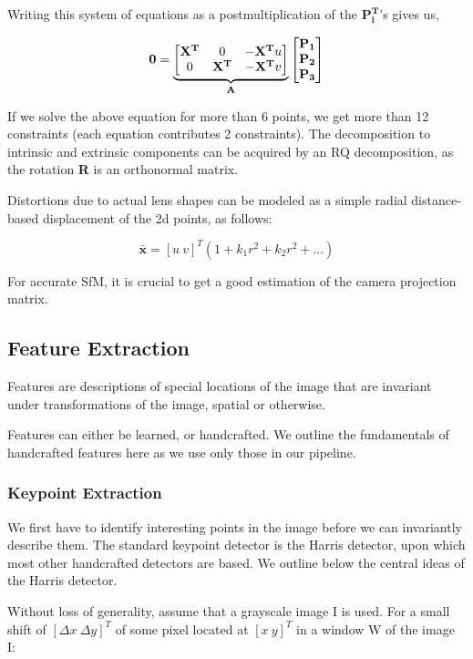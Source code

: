 Writing this system of equations as a postmultiplication of the $\mathbf{P_i^T}$'s gives us,

\[\mathbf{0} = \underbrace{\begin{bmatrix}
\mathbf{X^T} & 0 & -\mathbf{X^T}u\\
0 & \mathbf{X^T} & -\mathbf{X^T}v\\
\end{bmatrix}}_{\text{\textbf{A}}} \begin{bmatrix}
\mathbf{P_1}\\
\mathbf{P_2}\\
\mathbf{P_3}\end{bmatrix}\]

If we solve the above equation for more than 6 points, we get more than 12 constraints (each equation contributes 2 constraints). The decomposition to intrinsic and extrinsic components can be acquired by an RQ decomposition, as the rotation \textbf{R} is an orthonormal matrix.

Distortions due to actual lens shapes can be modeled as a simple radial distance-based displacement of the 2d points, as follows:

\[\bar{\mathbf{x}} = [u\ v]^T (1 + k_1r^2 + k_2r^2 + ...)\]

For accurate SfM, it is crucial to get a good estimation of the camera projection matrix. 

\subsection{Feature Extraction}
Features are descriptions of special locations of the image that are invariant under transformations of the image, spatial or otherwise. 

Features can either be learned, or handcrafted. We outline the fundamentals of handcrafted features here as we use only those in our pipeline.
\subsubsection{Keypoint Extraction}
We first have to identify interesting points in the image before we can invariantly describe them. The standard keypoint detector is the Harris detector, upon which most other handcrafted detectors are based. We outline below the central ideas of the Harris detector. 

Without loss of generality, assume that a grayscale image I is used. For a small shift of $[\Delta x \ \Delta y]^T$ of some pixel located at $[x \ y]^T$ in a window W of the image I:

